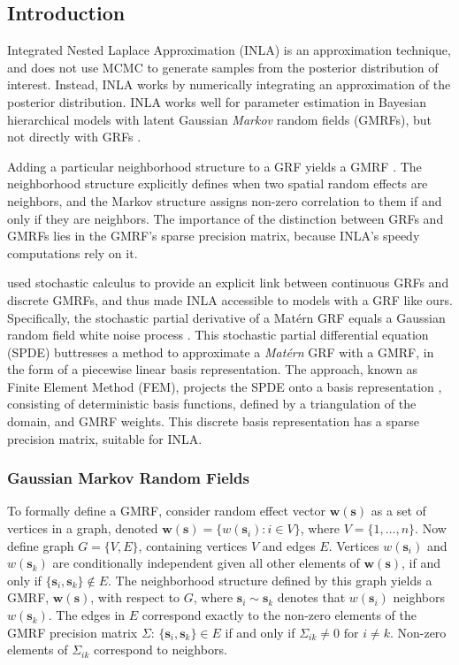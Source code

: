 \subsection{Introduction} %

Integrated Nested Laplace Approximation (INLA) is an approximation technique, and does not use MCMC to generate samples from the posterior distribution of interest. Instead, INLA works by numerically integrating an approximation of the posterior distribution. INLA works well for parameter estimation in Bayesian hierarchical models with latent Gaussian {\it Markov} random fields (GMRFs), but not directly with GRFs \citep{Rue2007}.

Adding a particular neighborhood structure to a GRF yields a GMRF \citep{Rue2007}. The neighborhood structure explicitly defines when two spatial random effects are neighbors, and the Markov structure assigns non-zero correlation to them if and only if they are neighbors. The importance of the distinction between GRFs and GMRFs lies in the GMRF's sparse precision matrix, because INLA's speedy computations rely on it.

\cite{Lindgren2011} used stochastic calculus \citep{Mao2007} to provide an explicit link between continuous GRFs and discrete GMRFs, and thus made INLA accessible to models with a GRF like ours. Specifically, the stochastic partial derivative of a Mat\'ern GRF equals a Gaussian random field white noise process \citep{Lindgren2011}. This stochastic partial differential equation (SPDE) buttresses a method to approximate a {\it Mat\'ern} GRF with a GMRF, in the form of a piecewise linear basis representation. The approach, known as Finite Element Method (FEM), projects the SPDE onto a basis representation \citep{Dhatt2012}, consisting of deterministic basis functions, defined by a triangulation of the domain, and GMRF weights. This discrete basis representation has a sparse precision matrix, suitable for INLA. 

\subsubsection{Gaussian Markov Random Fields} %

To formally define a GMRF, consider random effect vector $\pmb{w}(\pmb{s})$ as a set of vertices in a graph, denoted $\pmb{w}(\pmb{s}) = \{w(\pmb{s}_{i}):i \in V\}$, where $V = \{1,\dots,n\}$. Now define graph $G = \{ V, E \}$, containing vertices $V$ and edges $E$. Vertices $w(\pmb{s}_{i})$ and $w(\pmb{s}_{k})$ are conditionally independent given all other elements of $\pmb{w}(\pmb{s})$, if and only if $\{\pmb{s}_{i}, \pmb{s}_{k}\} \notin E$. The neighborhood structure defined by this graph yields a GMRF, $\pmb{w}(\pmb{s})$, with respect to $G$, where $\pmb{s}_{i} \sim \pmb{s}_{k}$ denotes that $w(\pmb{s}_{i})$ neighbors $w(\pmb{s}_{k})$. The edges in $E$ correspond exactly to the non-zero elements of the GMRF precision matrix $\Sigma$: $\{\pmb{s}_{i}, \pmb{s}_{k}\} \in E$ if and only if $\Sigma_{ik} \neq 0 \text{ for } i \neq k$. Non-zero elements of $\Sigma_{ik}$ correspond to neighbors.

